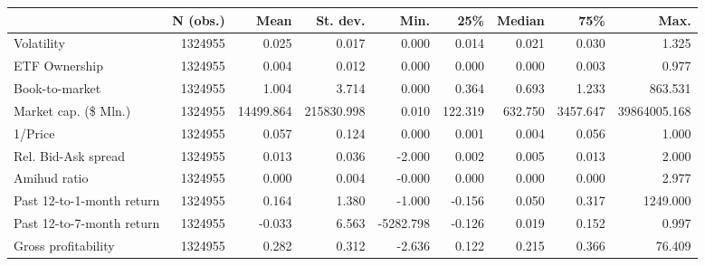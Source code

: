 \begin{tabular}{lrrrrrrrr}
\toprule
{} & N (obs.) &      Mean &   St. dev. &      Min. &     25\% &  Median &      75\% &         Max. \\
\midrule
Volatility                &  1324955 &     0.025 &      0.017 &     0.000 &   0.014 &   0.021 &    0.030 &        1.325 \\
ETF Ownership             &  1324955 &     0.004 &      0.012 &     0.000 &   0.000 &   0.000 &    0.003 &        0.977 \\
Book-to-market            &  1324955 &     1.004 &      3.714 &     0.000 &   0.364 &   0.693 &    1.233 &      863.531 \\
Market cap. (\$ Mln.)      &  1324955 & 14499.864 & 215830.998 &     0.010 & 122.319 & 632.750 & 3457.647 & 39864005.168 \\
1/Price                   &  1324955 &     0.057 &      0.124 &     0.000 &   0.001 &   0.004 &    0.056 &        1.000 \\
Rel. Bid-Ask spread       &  1324955 &     0.013 &      0.036 &    -2.000 &   0.002 &   0.005 &    0.013 &        2.000 \\
Amihud ratio              &  1324955 &     0.000 &      0.004 &    -0.000 &   0.000 &   0.000 &    0.000 &        2.977 \\
Past 12-to-1-month return &  1324955 &     0.164 &      1.380 &    -1.000 &  -0.156 &   0.050 &    0.317 &     1249.000 \\
Past 12-to-7-month return &  1324955 &    -0.033 &      6.563 & -5282.798 &  -0.126 &   0.019 &    0.152 &        0.997 \\
Gross profitability       &  1324955 &     0.282 &      0.312 &    -2.636 &   0.122 &   0.215 &    0.366 &       76.409 \\
\bottomrule
\end{tabular}
